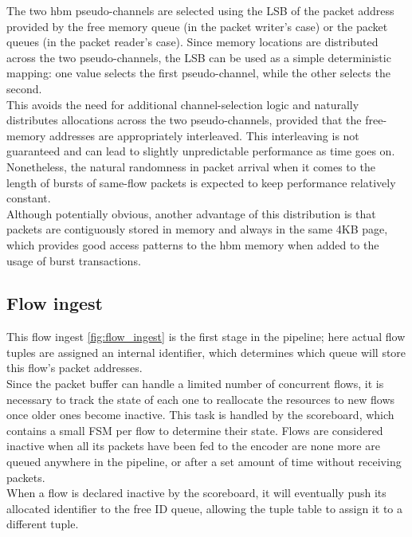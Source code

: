 The two \gls{hbm} pseudo-channels are selected using the LSB of the packet address provided by the free memory queue (in the packet writer's case) 
or the packet queues (in the packet reader's case). Since memory locations are distributed across the two pseudo-channels, the LSB can be 
used as a simple deterministic mapping: one value selects the first pseudo-channel, while the other selects the second. \\

This avoids the need for additional channel-selection logic and naturally distributes allocations across the two pseudo-channels, 
provided that the free-memory addresses are appropriately interleaved. This interleaving is not guaranteed and can lead to slightly unpredictable 
performance as time goes on. Nonetheless, the natural randomness in packet arrival when it comes to the length of bursts of same-flow 
packets is expected to keep performance relatively constant. \\

Although potentially obvious, another advantage of this distribution is that packets are contiguously stored in memory and always 
in the same 4KB page, which provides good access patterns to the \gls{hbm} memory when added to the usage of burst transactions.

\subsection{Flow ingest}
This flow ingest \ref{fig:flow_ingest} is the first stage in the pipeline; 
here actual flow tuples are assigned an internal identifier, which determines which queue will store this flow's packet addresses. \\

Since the packet buffer can handle a limited number of concurrent flows, it is necessary to track the state of each one to reallocate 
the resources to new flows once older ones become inactive. This task is handled by the scoreboard, which contains a small FSM per 
flow to determine their state. Flows are considered inactive when all its packets have been fed to the encoder are none more are 
queued anywhere in the pipeline, or after a set amount of time without receiving packets. \\

When a flow is declared inactive by the scoreboard, it will eventually push its allocated identifier to the free ID queue, 
allowing the tuple table to assign it to a different tuple.

